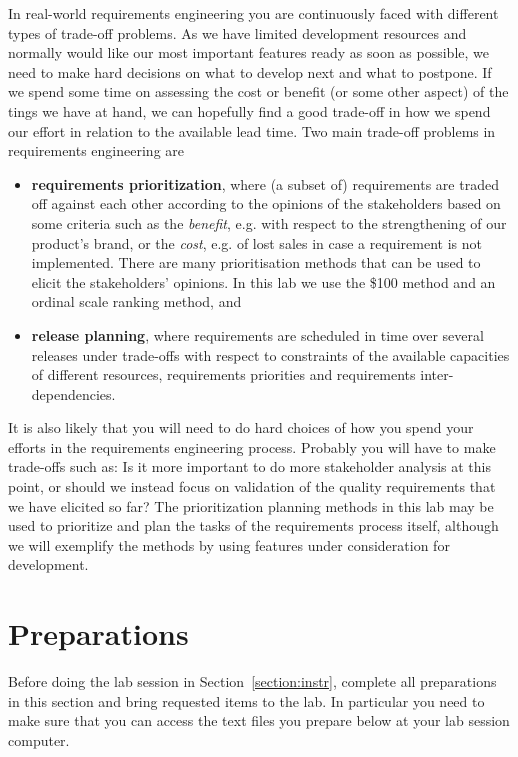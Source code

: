 \documentclass[11pt]{article}
\begin{document}
In real-world requirements engineering you are continuously faced with different types of trade-off problems. As we have limited development resources and normally would like our most important features ready as soon as possible, we need to make hard decisions on what to develop next and what to postpone. If we spend some time on assessing the cost or benefit (or some other aspect) of the tings we have at hand, we can hopefully find a good trade-off in how we spend our effort in relation to the available lead time. Two main trade-off problems in requirements engineering are
\begin{itemize}
\item {\bf requirements prioritization}, where (a subset of) requirements are traded off against each other according to the opinions of the stakeholders based on some criteria such as the {\it benefit}, e.g. with respect to the strengthening of our product's brand, or the {\it cost}, e.g. of lost sales in case a requirement is not implemented. There are many prioritisation methods that can be used to elicit the stakeholders'
opinions. In this lab we use the \$100 method and an ordinal scale ranking method, and
\item {\bf release planning}, where requirements are scheduled in time over several releases under trade-offs with respect to constraints of the available capacities of different resources, requirements priorities and requirements inter-dependencies. 
\end{itemize}

It is also likely that you will need to do hard choices of how you spend your efforts in the requirements engineering process. Probably you will have to make trade-offs such as: Is it more important to do more stakeholder analysis at this point, or should we instead focus on validation of the quality requirements that we have elicited so far? The prioritization planning methods in this lab may be used to prioritize and plan the tasks of the requirements process itself, although we will exemplify the methods by using features under consideration for development.



\clearpage\newpage
\section{Preparations}\label{section:prep}
\begin{framed} \noindent Before doing the lab session in Section~\ref{section:instr}, complete all preparations in this section and bring requested items to the lab. In particular you need to make sure that you can access the text files you prepare below at your lab session computer.
\end{framed}
\end{document}

